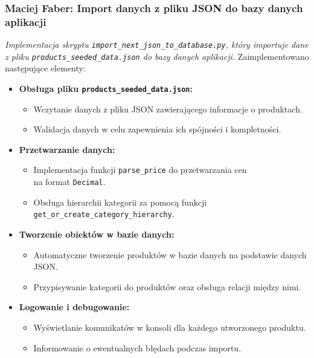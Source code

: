 \documentclass[12pt,a4paper,oneside]{article}
\theoremstyle{definition}
\numberwithin{equation}{section}
\begin{document}
\subsubsection{Maciej Faber: Import danych z pliku JSON do bazy danych aplikacji}
\label{section:1.3.42}
\textit{
Implementacja skryptu \texttt{import\_next\_json\_to\_database.py}, który importuje dane z pliku \texttt{products\_seeded\_data.json} do bazy danych aplikacji.
}
Zaimplementowano następujące elementy:
\begin{itemize}
    \item \textbf{Obsługa pliku \texttt{products\_seeded\_data.json}:}
    \begin{itemize}
        \item Wczytanie danych z pliku JSON zawierającego informacje o produktach.
        \item Walidacja danych w celu zapewnienia ich spójności i kompletności.
    \end{itemize}
    \item \textbf{Przetwarzanie danych:}
    \begin{itemize}
        \item Implementacja funkcji \texttt{parse\_price} do przetwarzania cen\\ na format \texttt{Decimal}.
        \item Obsługa hierarchii kategorii za pomocą funkcji\\ \texttt{get\_or\_create\_category\_hierarchy}.
    \end{itemize}
    \item \textbf{Tworzenie obiektów w bazie danych:}
    \begin{itemize}
        \item Automatyczne tworzenie produktów w bazie danych na podstawie danych JSON.
        \item Przypisywanie kategorii do produktów oraz obsługa relacji między nimi.
    \end{itemize}
    \item \textbf{Logowanie i debugowanie:}
    \begin{itemize}
        \item Wyświetlanie komunikatów w konsoli dla każdego utworzonego produktu.
        \item Informowanie o ewentualnych błędach podczas importu.
    \end{itemize}
\end{itemize}
\end{document}
